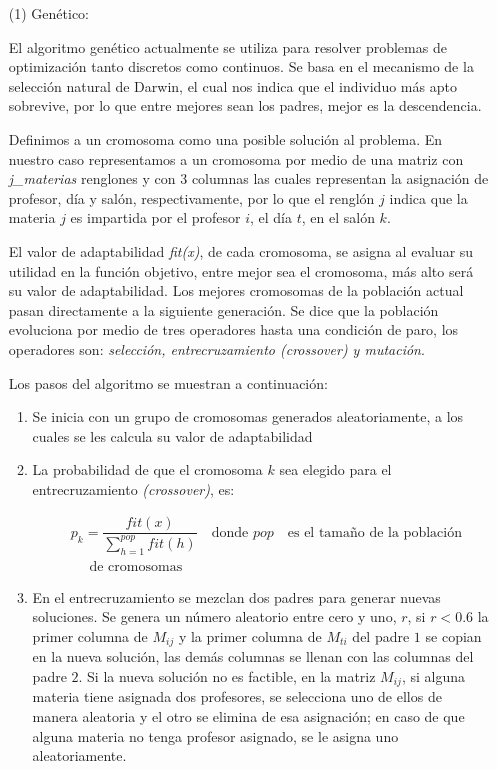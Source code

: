 \documentclass[12pt,spanish]{report}
\begin{document}
  \begin{itemize}
\item[(1)] Genético:

El algoritmo genético actualmente se utiliza para resolver problemas de optimización tanto discretos como continuos. Se basa en el mecanismo de la selección natural de Darwin, el cual nos indica que el individuo más apto sobrevive, por lo que entre mejores sean los padres, mejor es la descendencia.

Definimos a un cromosoma como una posible solución al problema. En nuestro caso representamos a un cromosoma por medio de una matriz con \textit{j\_materias} renglones y con 3 columnas las cuales representan la asignación de profesor, día y salón, respectivamente, por lo que el renglón $j$ indica que la materia $j$ es impartida por el profesor $i$, el día $t$, en el salón $k$.

El valor de adaptabilidad \textit{fit(x)}, de cada cromosoma, se asigna al evaluar su utilidad en la función objetivo, entre mejor sea el cromosoma, más alto será su valor de adaptabilidad. Los mejores cromosomas de la población actual pasan directamente a la siguiente generación. Se dice que la población evoluciona por medio de tres operadores hasta una condición de paro, los operadores son: \textit{selección, entrecruzamiento \textit{(crossover)} y mutación}.

Los pasos del algoritmo se muestran a continuación:


\begin{enumerate}
\item Se inicia con un grupo de cromosomas generados aleatoriamente, a los cuales se les calcula su valor de adaptabilidad

\item La probabilidad de que el cromosoma $k$ sea elegido para el entrecruzamiento \textit{(crossover)}, es:
  
\begin{equation*}
\begin{split}
&p_{k} = \dfrac{fit(x)}{\displaystyle \sum_{h = 1}^{pop} fit(h)} \,\,\,\, \text{ donde } pop \,\,\,\, \text{ es el tamaño de la población}\\
&\quad \text{ de cromosomas }
\end{split}
\end{equation*}


\item En el entrecruzamiento se mezclan dos padres para generar nuevas soluciones. Se genera un número aleatorio entre cero y uno, $r$, si $r < 0.6$  la primer columna de $M_{ij}$ y la primer columna de $M_{ti}$ del padre $1$ se copian en la nueva solución, las demás columnas se llenan con las columnas del padre $2$. Si la nueva solución no es factible, en la matriz $M_{ij}$, si alguna materia tiene asignada dos profesores, se selecciona uno de ellos de manera aleatoria y el otro se elimina de esa asignación; en caso de que alguna materia no tenga profesor asignado, se le asigna uno aleatoriamente.


\end{enumerate}
\end{itemize}
\end{document}
